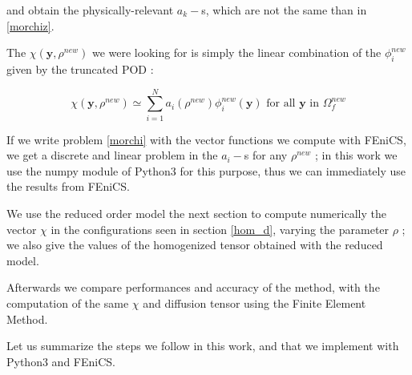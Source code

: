 and obtain the physically-relevant $a_k -$s, which are not the same than in \ref{morchiz}.

\par
The $\chi(\mathbf{y},\rho^{new})$ we were looking for is simply the linear combination of the $\phi_i^{new}$ given by the truncated POD :

\begin{equation}\label{newrom}
\chi\left(\mathbf{y},\rho^{new}\right)\simeq \sum\limits_{i=1}^N a_i \left(\rho^{new}\right)\phi_i^{new}(\mathbf{y})\text{ for all $\mathbf{y}$ in $\Omega_f^{new}$}
\end{equation}

\par
If we write problem \ref{morchi} with the vector functions we compute with FEniCS, %
we get a discrete and linear problem in the $a_i-$s for any $\rho^{new}$ ; %
in this work we use the numpy module of Python3 for this purpose, thus we can immediately use the results from FEniCS.

\par
We use the reduced order model the next section to compute numerically the vector $\chi$ in the configurations seen in section \ref{hom_d}, %
varying the parameter $\rho$ ; we also give the values of the homogenized tensor obtained with the reduced model.

\par
Afterwards we compare performances and accuracy of the method, with the computation of the same $\chi$ and diffusion tensor using the Finite Element Method.

\par
Let us summarize the steps we follow in this work, and that we implement with Python3 and FEniCS.

